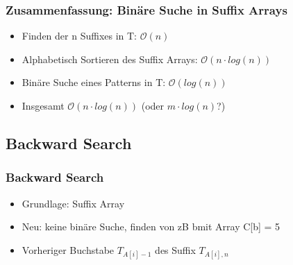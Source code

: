 \documentclass{beamer}
\begin{document}
\begin{frame}
\frametitle{Zusammenfassung: Binäre Suche in Suffix Arrays}
\begin{itemize}
\item Finden der n Suffixes in T: $\mathcal{O}(n)$
\item Alphabetisch Sortieren des Suffix Arrays: $\mathcal{O}(n\cdot log (n))$
\item Binäre Suche eines Patterns in T: $\mathcal{O}(log (n))$
\item Insgesamt $\mathcal{O}(n \cdot log (n))$ (oder $m \cdot log (n)$?)
\end{itemize}
\end{frame}
\subsection{Backward Search}
\begin{frame}
\frametitle{Backward Search}
\begin{itemize}
\item Grundlage: Suffix Array
\item Neu: keine binäre Suche, finden von zB \glqq b\grqq mit Array C[\glqq b\grqq ] = 5
\item Vorheriger Buchstabe $T_{A[i]-1}$ des Suffix $T_{A[i],n}$
\end{itemize}
\end{frame}
\end{document}
